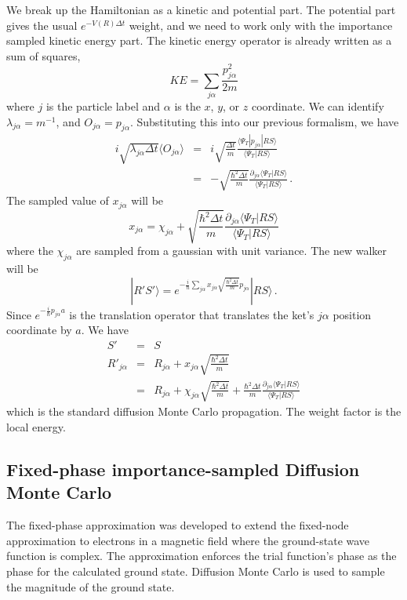 We break up the Hamiltonian as a kinetic and potential part. The potential
 part gives the usual $e^{-V(R) \Delta t}$ weight, and we need to work only
 with the importance sampled kinetic energy part.
 The kinetic energy operator is already written as a sum of squares,
 \begin{equation}
 KE = \sum_{j\alpha} \frac{p_{j\alpha}^2}{2m}
 \end{equation}
 where $j$ is the particle label and $\alpha$ is the $x$, $y$, or $z$ coordinate.
 We can identify $\lambda_{j\alpha} = m^{-1}$, and $O_{j\alpha} = p_{j\alpha}$.
 Substituting this into our previous formalism, we have
 \begin{eqnarray}
 i \sqrt{\lambda_{j\alpha} \Delta t}\langle O_{j\alpha} \rangle
 &=& i \sqrt{\frac{\Delta t}{m}} \frac{\langle \Psi_T |p_{j\alpha}|RS\rangle}
 {\langle \Psi_T |RS\rangle} 
 \nonumber\\
 &=& -\sqrt{\frac{\hbar^2 \Delta t}{m}}
 \frac{\partial_{j\alpha} \langle \Psi_T |RS\rangle}
 {\langle \Psi_T |RS\rangle}  \,.
 \end{eqnarray}
 The sampled value of $x_{j\alpha}$ will be
 \begin{equation}
 x_{j\alpha} = \chi_{j\alpha} + 
 \sqrt{\frac{\hbar^2 \Delta t}{m}}
 \frac{\partial_{j\alpha} \langle \Psi_T |RS\rangle}
 {\langle \Psi_T |RS\rangle}
 \end{equation}
 where the $\chi_{j\alpha}$ are sampled from a gaussian with unit variance.
 The new walker will be
 \begin{equation}
 |R'S'\rangle = e^{-\frac{i}{\hbar} \sum_{j\alpha} x_{j\alpha}
 	\sqrt{\frac{\hbar^2 \Delta t}{m}} p_{j\alpha} }|R S\rangle \,.
 \end{equation}
 Since
 $e^{-\frac{i}{\hbar} p_{j\alpha} a}$ is the translation operator that
 translates the ket's $j\alpha$ position coordinate by $a$.
 We have
 \begin{eqnarray}
 S' &=& S
 \nonumber\\
 R'_{j\alpha} &=& R_{j\alpha} + x_{j\alpha}\sqrt{\frac{\hbar^2 \Delta t}{m}}
 \nonumber\\
 &=& R_{j\alpha}+ \chi_{j\alpha} \sqrt{\frac{\hbar^2 \Delta t}{m}}
 +
 \frac{\hbar^2 \Delta t}{m}
 \frac{\partial_{j\alpha} \langle \Psi_T |RS\rangle}
 {\langle \Psi_T |RS\rangle}
 \end{eqnarray}
 which is the standard diffusion Monte Carlo propagation. The weight factor
 is the local energy.
 
 \subsection{Fixed-phase importance-sampled Diffusion Monte Carlo}
 \label{sec:fixedph}
 The fixed-phase approximation\cite{Ortiz93} was developed to extend the
 fixed-node approximation to electrons in a magnetic field where the
 ground-state wave function is complex. The approximation enforces the
 trial function's phase as the phase for the calculated ground state.
 Diffusion Monte Carlo is used to sample the magnitude of the ground
 state.
 
